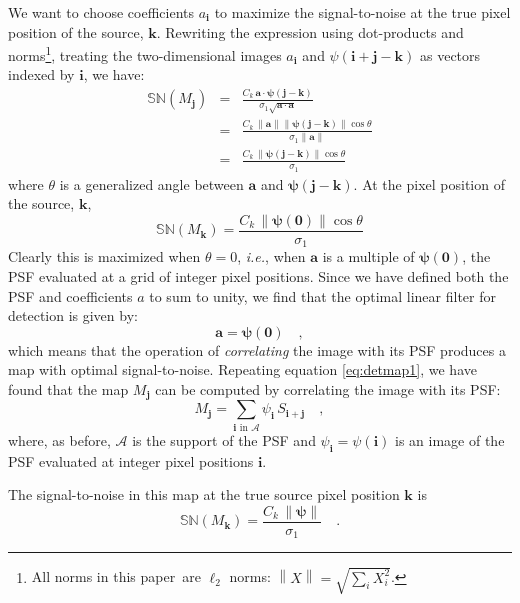 \documentclass[letterpaper,preprint]{aastex}
\newcommand{\doctype}{paper}
\newcommand{\latin}[1]{\emph{#1}}
\newcommand{\ie}{\latin{i.e.}}
\newcommand{\psf}{\psi}
\newcommand{\psfat}[1]{\psf_{#1}}
\newcommand{\signoise}{[S/N]}
\newcommand{\snr}[1]{\mathbb{SN}(#1)}
\newcommand{\norm}[1]{\left\lVert #1 \right\rVert}
\renewcommand{\vec}[1]{\boldsymbol{#1}}
\newcommand{\avec}{\vec{a}}
\newcommand{\ivec}{\vec{i}}
\newcommand{\jvec}{\vec{j}}
\newcommand{\kvec}{\vec{k}}
\newcommand{\iina}{\ivec \,\, \mathrm{in} \,\, \mathcal{A}}
\begin{document}
We want to choose coefficients $a_{\ivec}$ to maximize the 
signal-to-noise at the true pixel position of the source,
$\kvec$.  Rewriting the expression using dot-products and
norms\footnote{All norms in this \doctype\ are $\ell_2$ norms: $\norm{X} =
  \sqrt{\sum_i X_i^2}$.}, treating the two-dimensional images
$a_{\ivec}$ and $\psi(\ivec + \jvec - \kvec)$ as vectors indexed by
$\ivec$, we have:
\begin{eqnarray}
  \snr{M_{\jvec}} &=& \frac{C_k \, \avec \cdot \bm{\psi(j-k)}}{\sigma_1 \sqrt{\avec \cdot \avec}} \\
 &=& \frac{C_k \, \norm{\avec} \norm{\bm{\psi(j-k)}} \cos \theta}{\sigma_1 \norm{\avec}} \\
 &=& \frac{C_k \, \norm{\bm{\psi(j-k)}} \cos \theta}{\sigma_1}
\end{eqnarray}
where $\theta$ is a generalized angle between $\avec$ and $\bm{\psi(j-k)}$.
At the pixel position of the source, $\kvec$,
\begin{equation}
\snr{M_{\kvec}} = \frac{C_k \, \norm{\bm{\psi(0)}} \cos \theta}{\sigma_1}
\label{eqn:sndsingle}
\end{equation}
Clearly this is maximized when $\theta = 0$, \ie, when $\avec$ is a
multiple of $\bm{\psi(0)}$, the PSF evaluated at a grid of integer
pixel positions.  Since we have defined both the PSF and coefficients
$a$ to sum to unity, we find that the optimal linear filter for
detection is given by:
\begin{equation}
\avec = \bm{\psi(0)} \quad ,
\end{equation}
which means that the operation of \emph{correlating} the image with
its PSF produces a map with optimal signal-to-noise.  Repeating
equation \ref{eq:detmap1}, we have found that the map $M_{\jvec}$ can
be computed by correlating the image with its PSF:
\begin{equation}
M_{\jvec} = \sum_{\iina} \psi_{\ivec} \, S_{\ivec + \jvec} \quad ,
\end{equation}
where, as before, $\mathcal{A}$ is the support of the PSF and
$\psfat{\ivec} = \psi(\ivec)$ is an image of the PSF evaluated at
integer pixel positions $\ivec$.

The signal-to-noise in this map at the true source pixel
position $\kvec$ is
\begin{equation}
\snr{M_{\kvec}} = \frac{C_k \, \norm{\bm{\psi}}}{\sigma_1} \quad .
\end{equation}
\end{document}
